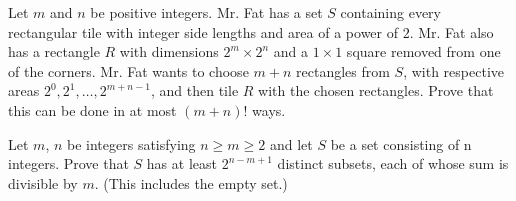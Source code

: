 \documentclass{article}
\begin{document}
\begin{prob}{13}
Let $m$ and $n$ be positive integers.  Mr. Fat has a set $S$ containing every rectangular tile with integer side lengths and area of a power of $2$.  Mr. Fat also has a rectangle $R$ with dimensions $2^m \times 2^n$ and a $1 \times 1$ square removed from one of the corners.  Mr. Fat wants to choose $m + n$ rectangles from $S$, with respective areas $2^0, 2^1, \ldots, 2^{m + n - 1}$, and then tile $R$ with the chosen rectangles.  Prove that this can be done in at most $(m + n)!$ ways.
\end{prob}

\begin{prob}{13}
Let $m$, $n$ be integers satisfying $n \geq m \geq 2$ and let $S$ be a set consisting of n integers. Prove that $S$ has at least $2^{n-m+1}$ distinct subsets, each of whose sum is divisible by $m$. (This includes the empty set.)
\end{prob}
\end{document}

